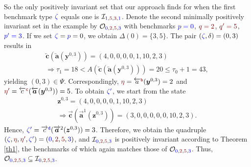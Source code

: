 \documentclass[10 pt,twocolumn,journal]{IEEEtran}
\theoremstyle{plain}
\renewcommand{\O}{\mathcal{O}}
\newcommand{\I}{\mathcal{I}}
\newcommand{\y}{\bm{y}}
\newcommand{\z}{\bm{z}}
\renewcommand{\a}{\bm{a}}
\renewcommand{\c}{\bm{c}}
\newcommand{\p}{\tb{p}}
\newcommand{\pp}{\tb{p'}}
\newcommand{\q}{\tr{q}}
\newcommand{\qq}{\tr{q'}}
\renewcommand{\r}{\tb{\zeta}}
\newcommand{\rr}{\tb{\zeta'}}
\newcommand{\s}{\tr{\eta}}
\renewcommand{\ss}{\tr{\eta'}}
\renewcommand{\d}{{\delta}}
\renewcommand{\o}{\tr{\mathtt{b}}}
\newcommand{\oo}{\tr{\mathtt{c}}}
\newcommand{\nn}{\tb{\mathtt{d}}}
\newcommand{\tb}{\textcolor{blue}}
\newcommand{\tr}{\textcolor{Myred}}
\theoremstyle{definition}
\begin{document}
So the only positively invariant set that our approach finds for when the first benchmark type $\r$ equals one is $\I_{\tb{1},\tr{5},\tr{3},\tb{1}}$.
%
Denote the second minimally positively invariant set in the example by $\mathcal{O}_{\tb{0}, \tr{2}, \tr{5}, \tb{3}}$ with benchmarks
$\tb{\p = 0}$, $\tr{\q = 2}$, $\tr{\qq = 5}$, $\tb{\pp = 3}$.
If we set $\r=\p=0$, we obtain $\Delta(0)=\{3,5\}$.
The pair $(\r, \d) = (0,3)$ results in  
\begin{gather*}
    \overleftarrow{\c}(\overleftarrow{\a}(\y^{0,3})) 
    = (4,0,0,0, 0,1,10,2,3)\\
    \Rightarrow
     {\tau_1} = 18  < 
     A(\overleftarrow{\c}(\overleftarrow{\a}(\y^{0,3}))) = 20 \leq {\tau_0} + 1 = 43,
\end{gather*}
yielding $(0,3)\in\Psi$.
Correspondingly, $\s = \overleftarrow{a}^{\o}(\y^{0,3}) = 2$ and $\ss = \overleftarrow{c}^{\oo}(\overleftarrow{\a}(\y^{0,3})) = 5$. 
To obtain $\rr$, we start from the state
\begin{gather*}
    \z^{0,3} = 
    (4,0,0,0,0,1,10,2,3)\\
    \Rightarrow
    \overrightarrow{\c}(\overrightarrow{\a}^{1}(\z^{0,3})) = 
    (3,0,0,0,0,0,10,2,3).
\end{gather*}
Hence, $\rr= \overrightarrow{c}^{\nn}(\overrightarrow{\a}^{2}(\z^{0,3})) = 3$.
Therefore, we obtain the quadruple $(\r,\s,\ss,\rr) = (\tb{0},\tr{2},\tr{5},\tb{3})$, and $\I_{\tb{0}, \tr{2}, \tr{5}, \tb{3}}$ is positively invariant according to Theorem \ref{th1}, the benchmarks of which again matches those of $\O_{\tb{0}, \tr{2}, \tr{5}, \tb{3}}$.
Thus, $\O_{\tb{0}, \tr{2}, \tr{5}, \tb{3}}\subseteq\I_{\tb{0}, \tr{2}, \tr{5}, \tb{3}}$.
\end{document}
